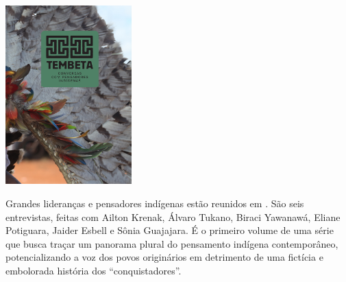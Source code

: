 \begin{center}
\hspace*{-2.4cm}
\hspace*{1.8cm}\includegraphics[width=48.7mm]{./imgs/tembeta.jpg}
\end{center}

\hspace*{-7cm}\hrulefill\hspace*{-7cm}

\medskip

\noindent{}Grandes lideranças e pensadores indígenas estão reunidos em {}. São seis entrevistas, feitas com Ailton Krenak, Álvaro Tukano, Biraci Yawanawá, Eliane Potiguara, Jaider Esbell e Sônia Guajajara. É o primeiro volume de uma série que busca traçar um panorama plural do pensamento indígena contemporâneo, potencializando a voz dos povos originários em detrimento de uma fictícia e embolorada história dos “conquistadores”.

\vfill

\hspace*{-.4cm}\begin{minipage}[c]{1\linewidth}
\small{
{}}
\end{minipage}


\pagebreak

